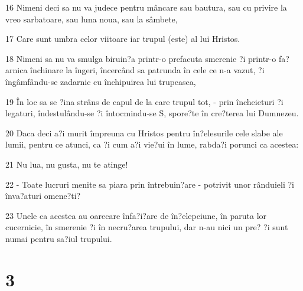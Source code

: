 \par 16 Nimeni deci sa nu va judece pentru mâncare sau bautura, sau cu privire la vreo sarbatoare, sau luna noua, sau la sâmbete,
\par 17 Care sunt umbra celor viitoare iar trupul (este) al lui Hristos.
\par 18 Nimeni sa nu va smulga biruin?a printr-o prefacuta smerenie ?i printr-o fa?arnica închinare la îngeri, încercând sa patrunda în cele ce n-a vazut, ?i îngâmfându-se zadarnic cu închipuirea lui trupeasca,
\par 19 În loc sa se ?ina strâns de capul de la care trupul tot, - prin încheieturi ?i legaturi, îndestulându-se ?i întocmindu-se S, spore?te în cre?terea lui Dumnezeu.
\par 20 Daca deci a?i murit împreuna cu Hristos pentru în?elesurile cele slabe ale lumii, pentru ce atunci, ca ?i cum a?i vie?ui în lume, rabda?i porunci ca acestea:
\par 21 Nu lua, nu gusta, nu te atinge!
\par 22 - Toate lucruri menite sa piara prin întrebuin?are - potrivit unor rânduieli ?i înva?aturi omene?ti?
\par 23 Unele ca acestea au oarecare înfa?i?are de în?elepciune, în paruta lor cucernicie, în smerenie ?i în necru?area trupului, dar n-au nici un pre? ?i sunt numai pentru sa?iul trupului.

\chapter{3}

